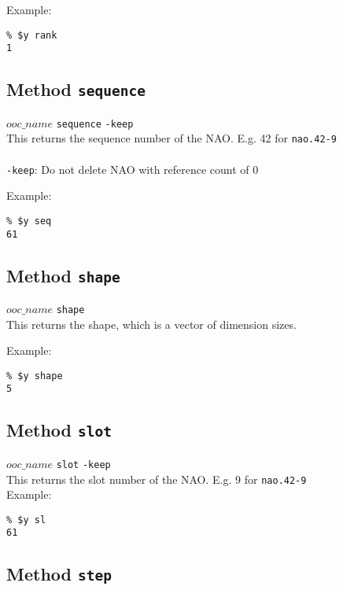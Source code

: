 Example:
  \begin{verbatim}
% $y rank
1
\end{verbatim}

  \subsection{
    \label{sequence}Method \texttt{sequence}
  }

  


  $ooc\_name$ 
  \texttt{sequence} 
  \texttt{-keep}
  \\
  

This returns the sequence number of the NAO. E.g. 42 for 
  \texttt{nao.42-9}
  \\
  \\
  \texttt{-keep}: Do not delete NAO with reference count of 0
  

Example:
  \begin{verbatim}
% $y seq
61
\end{verbatim}

  \subsection{
    \label{shape}Method \texttt{shape}
  }

  


  $ooc\_name$ 
  \texttt{shape}
  \\
  

This returns the shape, which is a vector of dimension sizes.
  

Example:
  \begin{verbatim}
% $y shape
5
\end{verbatim}

  \subsection{
    \label{slot}Method \texttt{slot}
  }

  


  $ooc\_name$ 
  \texttt{slot} 
  \texttt{-keep}
  \\
  

This returns the slot number of the NAO. E.g. 9 for 
  \texttt{nao.42-9}
  \\
  

Example:
  \begin{verbatim}
% $y sl
61
\end{verbatim}

  \subsection{
    \label{step}Method \texttt{step}
  }

